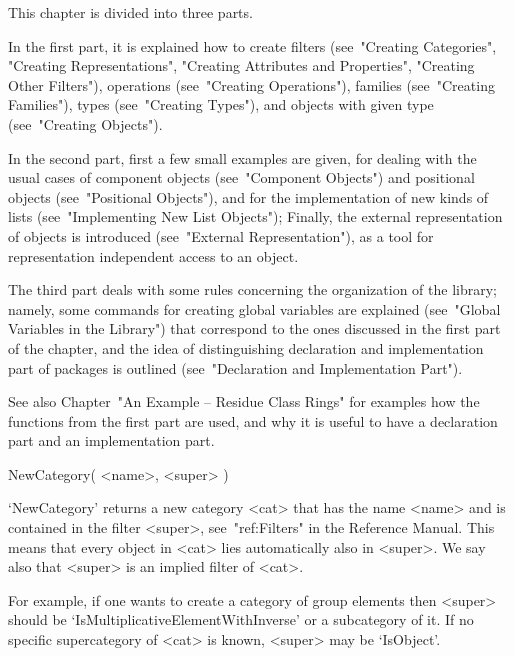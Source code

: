 

This chapter is divided into three parts.

In the first part, it is explained how to create
filters (see~"Creating Categories", "Creating Representations",
"Creating Attributes and Properties", "Creating Other Filters"),
operations (see~"Creating Operations"),
families (see~"Creating Families"),
types (see~"Creating Types"),
and objects with given type (see~"Creating Objects").

In the second part, first a few small examples are given,
for dealing with the usual cases of
component objects (see~"Component Objects")
and positional objects (see~"Positional Objects"),
and for the implementation of new kinds of lists
(see~"Implementing New List Objects");
Finally, the external representation of objects is introduced
(see~"External Representation"),
as a tool for representation independent access to an object.

The third part deals with some rules concerning the organization
of the {\GAP} library;
namely, some commands for creating global variables are explained
(see~"Global Variables in the Library")
that correspond to the ones discussed in the first part of the chapter,
and the idea of distinguishing declaration and implementation part
of {\GAP} packages is outlined (see~"Declaration and Implementation Part").

See also Chapter~"An Example -- Residue Class Rings" for examples
how the functions from the first part are used,
and why it is useful to have a declaration part and an implementation part.



\>NewCategory( <name>, <super> )

`NewCategory' returns a new category <cat> that has the name <name> and
is contained in the filter <super>,
see~"ref:Filters" in the Reference Manual.
This means that every object in <cat> lies automatically also in <super>.
We say also that <super> is an implied filter of <cat>.

For example, if one wants to create a category of group elements
then <super> should be `IsMultiplicativeElementWithInverse' or a
subcategory of it.
If no specific supercategory of <cat> is known,
<super> may be `IsObject'.

